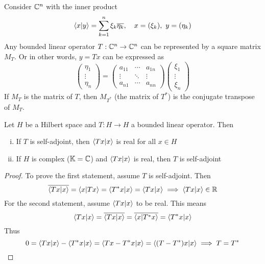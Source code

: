 \documentclass[../../script.tex]{subfiles}
\begin{document}
    \begin{eg}
        Consider $\mathbb{C}^n$ with the inner product 
        \[
            \innerproduct{x}{y} = \sum_{k=1}^n \xi_k \conj{\eta_k}, \quad x = (\xi_k), ~y = (\eta_k)
        \]
        Any bounded linear operator $T: \mathbb{C}^n \rightarrow \mathbb{C}^n$ can be represented by a square matrix $M_T$. Or in other words, $y = Tx$ can be expressed as 
        \[
            \begin{pmatrix}
                \eta_1 \\ \vdots \\ \eta_n
            \end{pmatrix}
            =
            \begin{pmatrix}
                a_{11} & \cdots & a_{1n} \\
                \vdots & \ddots & \vdots \\
                a_{n1} & \cdots & a_{nn}
            \end{pmatrix}
            \begin{pmatrix}
                \xi_1 \\ \vdots \\ \xi_n
            \end{pmatrix}
        \]
        If $M_T$ is the matrix of $T$, then $M_{T^*}$ (the matrix of $T^*$) is the conjugate transpose of $M_T$.
    \end{eg}

    \begin{thm}
        Let $H$ be a Hilbert space and $T: H \rightarrow H$ a bounded linear operator. Then 
        \begin{enumerate}[(i)]
            \item If $T$ is self-adjoint, then $\innerproduct{Tx}{x}$ is real for all $x \in H$
            \item If $H$ is complex ($\mathbb{K} = \mathbb{C}$) and $\innerproduct{Tx}{x}$ is real, then $T$ is self-adjoint 
        \end{enumerate}
    \end{thm}
    \begin{proof}
        To prove the first statement, assume $T$ is self-adjoint. Then 
        \begin{equation}
            \conj{\innerproduct{Tx}{x}} = \innerproduct{x}{Tx} = \innerproduct{T^*x}{x} = \innerproduct{Tx}{x} \implies \innerproduct{Tx}{x} \in \realn
        \end{equation}
        For the second statement, assume $\innerproduct{Tx}{x}$ to be real. This means 
        \begin{equation}
            \innerproduct{Tx}{x} = \conj{\innerproduct{Tx}{x}} = \conj{\innerproduct{x}{T^* x}} = \innerproduct{T^* x}{x}
        \end{equation}
        Thus 
        \begin{equation}
            0 = \innerproduct{Tx}{x} - \innerproduct{T^*x}{x} = \innerproduct{Tx - T^*x}{x} = \innerproduct{(T - T^*)x}{x} \implies T = T^*
        \end{equation}
    \end{proof}
\end{document}
